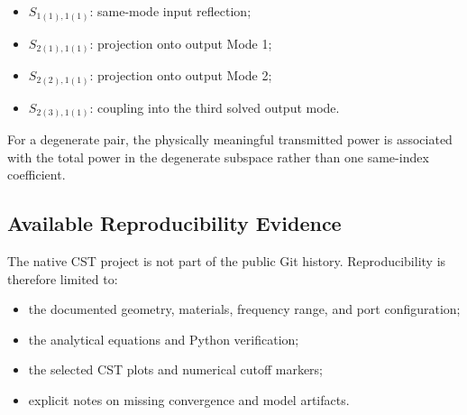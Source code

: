 \begin{itemize}
  \item \(S_{1(1),1(1)}\): same-mode input reflection;
  \item \(S_{2(1),1(1)}\): projection onto output Mode 1;
  \item \(S_{2(2),1(1)}\): projection onto output Mode 2;
  \item \(S_{2(3),1(1)}\): coupling into the third solved output mode.
\end{itemize}

For a degenerate pair, the physically meaningful transmitted power is associated with the total power in the degenerate subspace rather than one same-index coefficient.

\subsection{Available Reproducibility Evidence}

The native CST project is not part of the public Git history. Reproducibility is therefore limited to:

\begin{itemize}
  \item the documented geometry, materials, frequency range, and port configuration;
  \item the analytical equations and Python verification;
  \item the selected CST plots and numerical cutoff markers;
  \item explicit notes on missing convergence and model artifacts.
\end{itemize}
